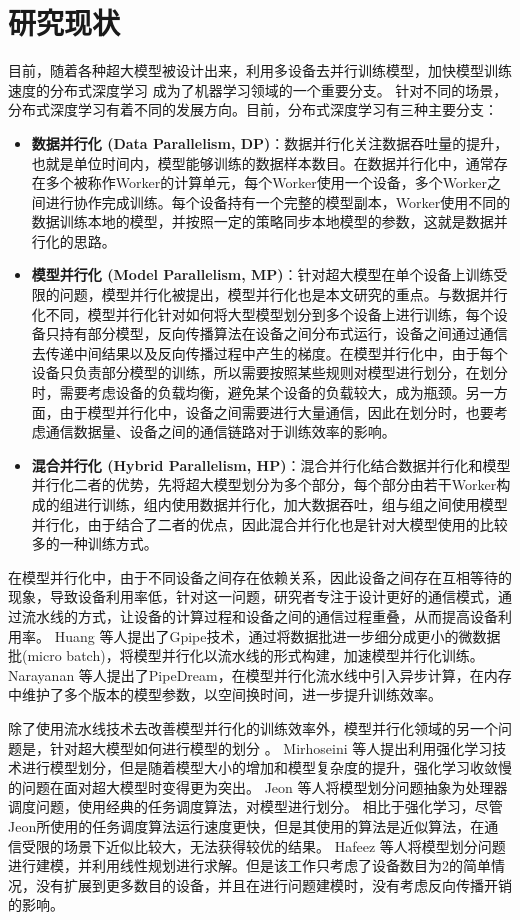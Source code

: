 \section{研究现状}
% 
目前，随着各种超大模型被设计出来，利用多设备去并行训练模型，加快模型训练速度的分布式深度学习 成为了机器学习领域的一个重要分支。
针对不同的场景，分布式深度学习有着不同的发展方向。目前，分布式深度学习有三种主要分支：
\begin{itemize}
	\item \textbf{数据并行化 (Data Parallelism, DP)}：数据并行化关注数据吞吐量的提升，也就是单位时间内，模型能够训练的数据样本数目。在数据并行化中，通常存在多个被称作Worker的计算单元，每个Worker使用一个设备，多个Worker之间进行协作完成训练。每个设备持有一个完整的模型副本，Worker使用不同的数据训练本地的模型，并按照一定的策略同步本地模型的参数，这就是数据并行化的思路。
	\item \textbf{模型并行化 (Model Parallelism, MP)}：针对超大模型在单个设备上训练受限的问题，模型并行化被提出，模型并行化也是本文研究的重点。与数据并行化不同，模型并行化针对如何将大型模型划分到多个设备上进行训练，每个设备只持有部分模型，反向传播算法在设备之间分布式运行，设备之间通过通信去传递中间结果以及反向传播过程中产生的梯度。在模型并行化中，由于每个设备只负责部分模型的训练，所以需要按照某些规则对模型进行划分，在划分时，需要考虑设备的负载均衡，避免某个设备的负载较大，成为瓶颈。另一方面，由于模型并行化中，设备之间需要进行大量通信，因此在划分时，也要考虑通信数据量、设备之间的通信链路对于训练效率的影响。
	\item \textbf{混合并行化 (Hybrid Parallelism, HP)}：混合并行化结合数据并行化和模型并行化二者的优势，先将超大模型划分为多个部分，每个部分由若干Worker构成的组进行训练，组内使用数据并行化，加大数据吞吐，组与组之间使用模型并行化，由于结合了二者的优点，因此混合并行化也是针对大模型使用的比较多的一种训练方式。
\end{itemize}

在模型并行化中，由于不同设备之间存在依赖关系，因此设备之间存在互相等待的现象，导致设备利用率低，针对这一问题，研究者专注于设计更好的通信模式，通过流水线的方式，让设备的计算过程和设备之间的通信过程重叠，从而提高设备利用率。
Huang  等人提出了Gpipe技术，通过将数据批进一步细分成更小的微数据批(micro batch)，将模型并行化以流水线的形式构建，加速模型并行化训练。
Narayanan  等人提出了PipeDream，在模型并行化流水线中引入异步计算，在内存中维护了多个版本的模型参数，以空间换时间，进一步提升训练效率。

除了使用流水线技术去改善模型并行化的训练效率外，模型并行化领域的另一个问题是，针对超大模型如何进行模型的划分 。
Mirhoseini  等人提出利用强化学习技术进行模型划分，但是随着模型大小的增加和模型复杂度的提升，强化学习收敛慢的问题在面对超大模型时变得更为突出。
Jeon  等人将模型划分问题抽象为处理器调度问题，使用经典的任务调度算法，对模型进行划分。
相比于强化学习，尽管Jeon所使用的任务调度算法运行速度更快，但是其使用的算法是近似算法，在通信受限的场景下近似比较大，无法获得较优的结果。
Hafeez  等人将模型划分问题进行建模，并利用线性规划进行求解。但是该工作只考虑了设备数目为2的简单情况，没有扩展到更多数目的设备，并且在进行问题建模时，没有考虑反向传播开销的影响。

